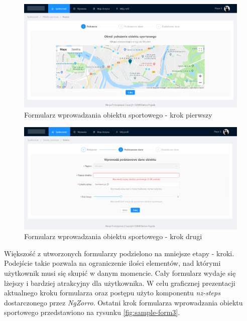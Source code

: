 \begin{figure}[H]
\centering
\includegraphics[width=\linewidth]{06-implementacja/rys/form1.PNG}
\caption{Formularz wprowadzania obiektu sportowego - krok pierwszy}
\label{fig:sample-form1}
\end{figure}



\begin{figure}[H]
\centering
\includegraphics[width=\linewidth]{06-implementacja/rys/form2.PNG}
\caption{Formularz wprowadzania obiektu sportowego - krok drugi}
\label{fig:sample-form2}
\end{figure}


Większość z utworzonych formularzy podzielono na mniejsze etapy - kroki. Podejście takie pozwala na ograniczenie ilości elementów, nad którymi użytkownik musi się skupić w danym momencie. Cały formularz wydaje się lżejszy i bardziej atrakcyjny dla użytkownika. W celu graficznej prezentacji aktualnego kroku formularza oraz postępu użyto komponentu \textit{nz-steps} dostarczonego przez \textit{NgZorro}. Ostatni krok formularza wprowadzania obiektu sportowego przedstawiono na rysunku \ref{fig:sample-form3}.

